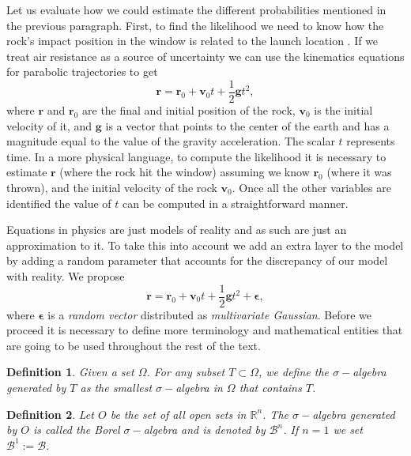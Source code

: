 \documentclass[12pt]{book}
\newtheorem{definition}{Definition}
\begin{document}
Let us evaluate how we could estimate the different probabilities mentioned in the previous paragraph. 
First, to find the likelihood
we need to know how the rock's impact position  in the window  is related to the launch location 
. If we treat air resistance as a source of uncertainty  we can use
the kinematics equations  for parabolic trajectories to get \cite{arnol2013mathematical}
\begin{equation}\label{eqnKinematics}
\textbf{r}=\textbf{r}_{0}+\textbf{v}_{0}t+\frac{1}{2}\textbf{g}t^{2},
\end{equation} 
where $\textbf{r}$ and $\textbf{r}_{0}$ are the final and initial position of the rock, 
$\textbf{v}_{0}$ is 
the initial velocity of it,  and $\textbf{g}$ is  a vector that points to the center of the earth and has a 
magnitude equal to the value of the gravity acceleration. The scalar $t$ represents time.
In a more physical language, to compute the likelihood it is necessary to estimate $\textbf{r}$ (where the 
rock hit the window) assuming we know $\textbf{r}_{0}$ (where it was thrown), and the initial velocity 
of the rock $\textbf{v}_{0}$. 
Once all the other variables are identified the value of $t$ can be computed in a straightforward manner. 

Equations in physics are just models of reality and as such are just an approximation to it. To take
this into account we add an extra layer to the model by adding a random parameter that accounts
for the discrepancy of our model with reality. We propose 
\begin{equation}\label{eqnParabolicEpsilon}
\textbf{r}=\textbf{r}_{0}+\textbf{v}_{0}t+\frac{1}{2}\textbf{g}t^{2}+\mathbf{\epsilon},
\end{equation} 
where $\mathbf{\epsilon}$ is a \textit{random vector} distributed as \textit{multivariate Gaussian}. 
Before we proceed it is necessary to define more terminology and mathematical entities  that are going 
to be used throughout the rest of the text. 

\begin{definition}
Given a set $\Omega$. For any subset $T\subset\Omega$, we define the $\sigma-$algebra generated by $T$ as
the smallest $\sigma-$algebra in $\Omega$ that contains $T$.
\end{definition}

\begin{definition}
Let $O$ be the set of all open sets in $\mathbb{R}^{n}$. The $\sigma-$algebra generated by $O$ is called
the Borel $\sigma-$algebra and is denoted by $\mathcal{B}^{n}$. If $n=1$ we set 
$\mathcal{B}^{1}:=\mathcal{B}$.
\end{definition}
\end{document}
